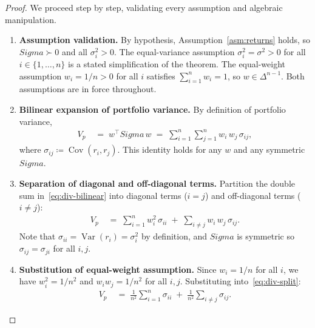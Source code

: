 \documentclass[12pt,openany]{book}
\newcommand{\bfw}{\mathbf{w}}
\newcommand{\bfSigma}{\boldsymbol{\Sigma}}
\DeclareMathOperator{\Var}{Var}
\DeclareMathOperator{\Cov}{Cov}
\numberwithin{equation}{chapter}
\theoremstyle{plain}
\theoremstyle{definition}
\theoremstyle{remark}
\def\bfw{w}%
\def\bfSigma{Sigma}%
\begin{document}
\begin{proof}
We proceed step by step, validating every assumption and algebraic
manipulation.

\begin{enumerate}
  \item \textbf{Assumption validation.}
        By hypothesis, Assumption~\ref{asm:returns} holds, so
        $\bfSigma \succ 0$ and all $\sigma_i^2 > 0$.
        The equal-variance assumption $\sigma_i^2 = \sigma^2 > 0$ for
        all $i \in \{1,\dots,n\}$ is a stated simplification of the
        theorem.  The equal-weight assumption $w_i = 1/n > 0$ for all
        $i$ satisfies $\sum_{i=1}^n w_i = 1$, so
        $\bfw \in \Delta^{n-1}$. Both assumptions are in force
        throughout.

  \item \textbf{Bilinear expansion of portfolio variance.}
        By definition of portfolio variance,
        \begin{align}
          V_p
          &\;=\; \bfw^\top \bfSigma\,\bfw
          \;=\; \sum_{i=1}^{n}\sum_{j=1}^{n}
                w_i\,w_j\,\sigma_{ij},
          \label{eq:div-bilinear}
        \end{align}
        where $\sigma_{ij} \coloneqq \Cov(r_i,r_j)$.  This identity
        holds for any $\bfw$ and any symmetric $\bfSigma$.

  \item \textbf{Separation of diagonal and off-diagonal terms.}
        Partition the double sum in~\eqref{eq:div-bilinear} into
        diagonal terms ($i = j$) and off-diagonal terms ($i \neq j$):
        \begin{align}
          V_p
          &\;=\; \sum_{i=1}^{n} w_i^2\,\sigma_{ii}
                 \;+\; \sum_{i \neq j} w_i\,w_j\,\sigma_{ij}.
          \label{eq:div-split}
        \end{align}
        Note that $\sigma_{ii} = \Var(r_i) = \sigma_i^2$ by
        definition, and $\bfSigma$ is symmetric so
        $\sigma_{ij} = \sigma_{ji}$ for all $i,j$.

  \item \textbf{Substitution of equal-weight assumption.}
        Since $w_i = 1/n$ for all $i$, we have $w_i^2 = 1/n^2$ and
        $w_i w_j = 1/n^2$ for all $i,j$.
        Substituting into~\eqref{eq:div-split}:
        \begin{align}
          V_p
          &\;=\; \frac{1}{n^2}\sum_{i=1}^{n}\sigma_{ii}
                 \;+\; \frac{1}{n^2}\sum_{i \neq j}\sigma_{ij}.
          \label{eq:div-equal-w}
        \end{align}


\end{enumerate}
\end{proof}
\end{document}
